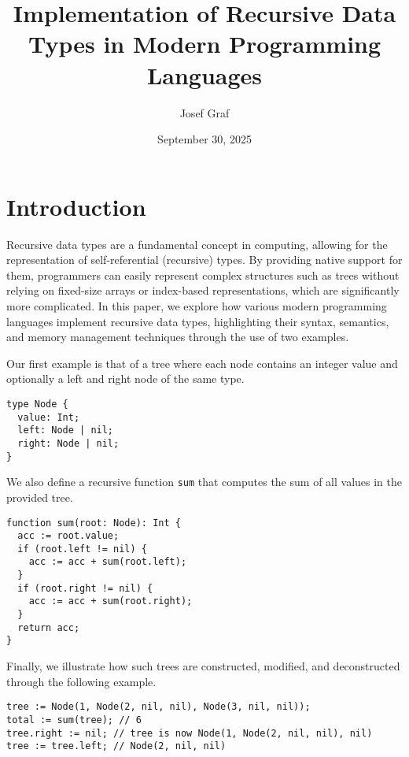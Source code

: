 \documentclass[12pt, letterpaper]{article}
\title{Implementation of Recursive Data Types in Modern Programming Languages}
\author{Josef Graf}
\date{September 30, 2025}
\begin{document}
\maketitle

\newpage

\section{Introduction}
Recursive data types are a fundamental concept in computing, allowing for the representation of self-referential (recursive) types. By providing native support for them, programmers can easily represent complex structures such as trees without relying on fixed-size arrays or index-based representations, which are significantly more complicated. In this paper, we explore how various modern programming languages implement recursive data types, highlighting their syntax, semantics, and memory management techniques through the use of two examples.

Our first example is that of a tree where each node contains an integer value and optionally a left and right node of the same type.
\begin{verbatim}
type Node {
  value: Int;
  left: Node | nil;
  right: Node | nil;
}
\end{verbatim}
We also define a recursive function \texttt{sum} that computes the sum of all values in the provided tree.
\begin{verbatim}
function sum(root: Node): Int {
  acc := root.value;
  if (root.left != nil) {
    acc := acc + sum(root.left);
  }
  if (root.right != nil) {
    acc := acc + sum(root.right);
  }
  return acc;
}
\end{verbatim}
Finally, we illustrate how such trees are constructed, modified, and deconstructed through the following example.
\begin{verbatim}
tree := Node(1, Node(2, nil, nil), Node(3, nil, nil));
total := sum(tree); // 6
tree.right := nil; // tree is now Node(1, Node(2, nil, nil), nil)
tree := tree.left; // Node(2, nil, nil)
\end{verbatim}
\end{document}
